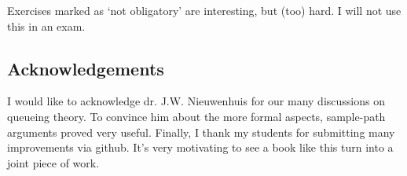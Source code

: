 \documentclass[companion]{subfiles}
\begin{document}
Exercises marked as `not obligatory' are interesting, but (too) hard.
I will not use this in an exam.

\subsection*{Acknowledgements}

I would like to acknowledge dr.
J.W.
Nieuwenhuis for our many discussions on queueing theory.
To convince him about the more formal aspects, sample-path arguments proved very useful.
Finally, I thank my students for submitting many improvements via github.
It's very motivating to see a book like this turn into a joint piece of work.

\end{document}
